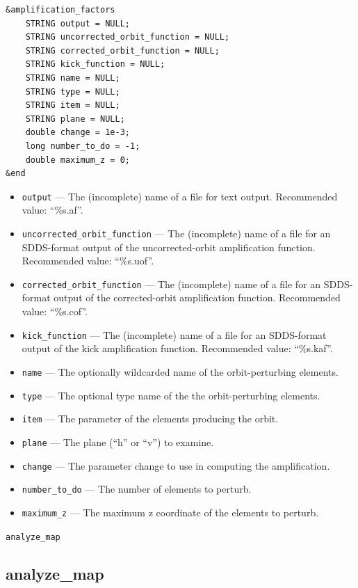 \documentclass[11pt]{article}
\begin{document}
\begin{verbatim}
&amplification_factors
    STRING output = NULL;
    STRING uncorrected_orbit_function = NULL;
    STRING corrected_orbit_function = NULL;
    STRING kick_function = NULL;
    STRING name = NULL;
    STRING type = NULL;
    STRING item = NULL;
    STRING plane = NULL;
    double change = 1e-3;
    long number_to_do = -1;
    double maximum_z = 0;
&end
\end{verbatim}

\begin{itemize}
\item \verb|output| ---  The (incomplete) name of a file for text output.   Recommended value: ``\%s.af''.
\item \verb|uncorrected_orbit_function| --- The (incomplete) name of a file for an SDDS-format output of the
    uncorrected-orbit amplification function.  Recommended value: ``\%s.uof''.
\item \verb|corrected_orbit_function| --- The (incomplete) name of a file for an SDDS-format output of the
    corrected-orbit amplification function.  Recommended value: ``\%s.cof''.
\item \verb|kick_function| --- The (incomplete) name of a file for an SDDS-format output of the kick amplification function.
Recommended value: ``\%s.kaf''.
\item \verb|name| --- The optionally wildcarded name of the orbit-perturbing elements.  
\item \verb|type| --- The optional type name of the the orbit-perturbing elements.
\item \verb|item| --- The parameter of the elements producing the orbit.
\item \verb|plane| --- The plane (``h'' or ``v'') to examine.
\item \verb|change| --- The parameter change to use in computing the amplification.  
\item \verb|number_to_do| --- The number of elements to perturb.
\item \verb|maximum_z| --- The maximum z coordinate of the elements to perturb.
\end{itemize}

\newpage
\begin{center}{\Large\verb|analyze_map|}\end{center}
\subsection{analyze\_map \label{subsec:analyzemap}}
\end{document}
